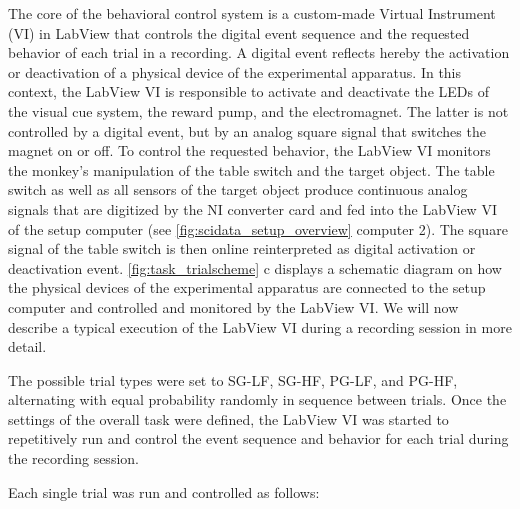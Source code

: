 {The core of the behavioral control system is a custom-made Virtual Instrument (VI) in LabView that controls the digital event sequence and the requested behavior of each trial in a recording. A digital event reflects hereby the activation or deactivation of a physical device of the experimental apparatus. In this context, the LabView VI is responsible to activate and deactivate the LEDs of the visual cue system, the reward pump, and the electromagnet. The latter is not controlled by a digital event, but by an analog square signal that switches the magnet on or off. To control the requested behavior, the LabView VI monitors the monkey's manipulation of the table switch and the target object. The table switch as well as all sensors of the target object produce continuous analog signals that are digitized by the NI converter card and fed into the LabView VI of the setup computer (see \cref{fig:scidata_setup_overview} computer 2). The square signal of the table switch is then online reinterpreted as digital activation or deactivation event. \cref{fig:task_trialscheme} c displays a schematic diagram on how the physical devices of the experimental apparatus are connected to the setup computer and controlled and monitored by the LabView VI. We will now describe a typical execution of the LabView VI during a recording session in more detail. 

The possible trial types were set to SG-LF, SG-HF, PG-LF, and PG-HF, alternating with equal probability randomly in sequence between trials. Once the settings of the overall task were defined, the LabView VI was started to repetitively run and control the event sequence and behavior for each trial during the recording session. 

Each single trial was run and controlled as follows: 

}
